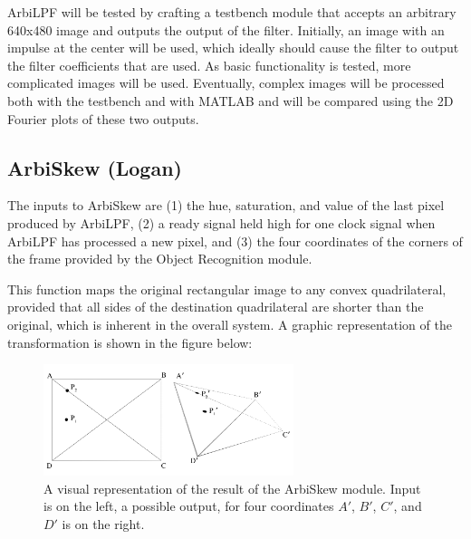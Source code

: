 \documentclass[10pt]{article}
\begin{document}
ArbiLPF will be tested by crafting a testbench module that accepts an arbitrary 640x480 image and outputs the output of the filter. Initially, an image with an impulse at the center will be used, which ideally should cause the filter to output the filter coefficients that are used. As basic functionality is tested, more complicated images will be used. Eventually, complex images will be processed both with the testbench and with MATLAB and will be compared using the 2D Fourier plots of these two outputs.

\subsection{ArbiSkew (Logan)}
The inputs to ArbiSkew are (1) the hue, saturation, and value of the last pixel produced by ArbiLPF, (2) a ready signal held high for one clock signal when ArbiLPF has processed a new pixel, and (3) the four coordinates of the corners of the frame provided by the Object Recognition module.

This function maps the original rectangular image to any convex quadrilateral, provided that all sides of the destination quadrilateral are shorter than the original, which is inherent in the overall system. A graphic representation of the transformation is shown in the figure below:

\begin{figure}[h!]
\centering
\includegraphics[width=0.65\textwidth]{arbiskew_graphic.png}
\caption{A visual representation of the result of the ArbiSkew module. Input is on the left, a possible output, for four coordinates $A\prime$, $B\prime$, $C\prime$, and $D\prime$ is on the right.}
\end{figure}
\end{document}
